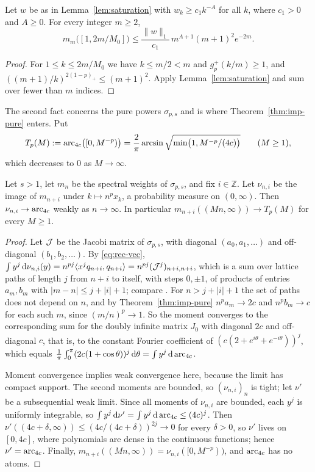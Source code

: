 \begin{corollary}\label{cor:head}
Let $w$ be as in Lemma~\ref{lem:saturation} with $w_k\ge c_1k^{-A}$ for all $k$, where $c_1>0$ and $A\ge0$. For every integer $m\ge2$,
\[
  m_m\bigl([1,2m/M_0]\bigr)\le\frac{\|w\|_1}{c_1}\,m^{A+1}(m+1)^2e^{-2m}.
\]
\end{corollary}

\begin{proof}
For $1\le k\le2m/M_0$ we have $k\le m/2<m$ and $g_p^+(k/m)\ge1$, and $((m+1)/k)^{2(1-p)_+}\le(m+1)^2$. Apply
Lemma~\ref{lem:saturation} and sum over fewer than $m$ indices.
\end{proof}

The second fact concerns the pure powers $\sigma_{p,s}$ and is where Theorem~\ref{thm:imp-pure} enters. Put
\begin{equation}\label{eq:Tp}
  T_p(M):=\operatorname{arc}_{4c}\bigl([0,M^{-p})\bigr)=\frac2\pi\arcsin\sqrt{\min\bigl(1,M^{-p}/(4c)\bigr)}\qquad(M\ge1),
\end{equation}
which decreases to $0$ as $M\to\infty$.

\begin{lemma}\label{lem:arcsine}
Let $s>1$, let $m_n$ be the spectral weights of $\sigma_{p,s}$, and fix $i\in\mathbb Z$. Let $\nu_{n,i}$ be the image
of $m_{n+i}$ under $k\mapsto n^px_k$, a probability measure on $(0,\infty)$. Then $\nu_{n,i}\to\operatorname{arc}_{4c}$ weakly as
$n\to\infty$. In particular $m_{n+i}((Mn,\infty))\to T_p(M)$ for every $M\ge1$.
\end{lemma}

\begin{proof}
Let $\mathcal{J}$ be the Jacobi matrix of $\sigma_{p,s}$, with diagonal $(a_0,a_1,\dots)$ and off-diagonal
$(b_1,b_2,\dots)$. By \eqref{eq:rec-vec}, $\int y^j\,\mathrm{d}\nu_{n,i}(y)=n^{pj}\langle x^jq_{n+i},q_{n+i}\rangle
=n^{pj}(\mathcal{J}^j)_{n+i,n+i}$, which is a sum over lattice paths of length $j$ from $n+i$ to itself, with steps $0,\pm1$,
of products of entries $a_m,b_m$ with $|m-n|\le j+|i|+1$; compare \cite[Proposition~3.3]{Simon}. For
$n>j+|i|+1$ the set of paths does not depend on $n$, and by Theorem~\ref{thm:imp-pure} $n^pa_m\to2c$ and $n^pb_m\to
c$ for each such $m$, since $(m/n)^p\to1$. So the moment converges to the corresponding sum for the doubly infinite
matrix $J_0$ with diagonal $2c$ and off-diagonal $c$, that is, to the constant Fourier coefficient of
$(c(2+e^{i\theta}+e^{-i\theta}))^j$, which equals $\frac1\pi\int_0^\pi(2c(1+\cos\theta))^j\,\mathrm{d}\theta=\int
y^j\,\mathrm{d}\operatorname{arc}_{4c}$.

Moment convergence implies weak convergence here, because the limit has compact support. The second moments
are bounded, so $(\nu_{n,i})_n$ is tight; let $\nu'$ be a subsequential weak limit. Since all moments of $\nu_{n,i}$ are
bounded, each $y^j$ is uniformly integrable, so $\int y^j\,\mathrm{d}\nu'=\int y^j\,\mathrm{d}\operatorname{arc}_{4c}\le(4c)^j$. Then
$\nu'((4c+\delta,\infty))\le(4c/(4c+\delta))^{2j}\to0$ for every $\delta>0$, so $\nu'$ lives on $[0,4c]$, where
polynomials are dense in the continuous functions; hence $\nu'=\operatorname{arc}_{4c}$. Finally,
$m_{n+i}((Mn,\infty))=\nu_{n,i}([0,M^{-p}))$, and $\operatorname{arc}_{4c}$ has no atoms.
\end{proof}

